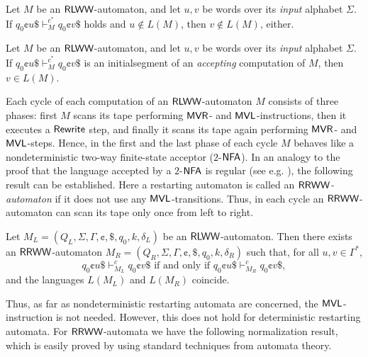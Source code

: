 \begin{proposition}
Let $M$ be an $\mbox{\sf RLWW}$-automaton, and let $u, v$ be words over its \emph{input} alphabet $\Sigma$. If $q_0 \cent u \$ \vdash_M^{c^*} q_0 \cent v \$$ holds and $u \notin L(M)$, then $v \notin L(M)$, either.
\end{proposition}

\begin{proposition}
Let $M$ be an $\mbox{\sf RLWW}$-automaton, and let $u, v$ be words over its \emph{input} alphabet $\Sigma$. If $q_0 \cent u \$ \vdash_M^{c^*} q_0 \cent v \$$ is an initialsegment of an \emph{accepting} computation of $M$, then $v \in L(M)$.
\end{proposition}

Each cycle of each computation of an $\mbox{\sf RLWW}$-automaton $M$ consists of three phases: first $M$ scans its tape performing \index{$\MVR$}$\MVR$- and \index{$\MVL$}$\MVL$-instructions, then it executes a \index{$\Rewrite$}$\Rewrite$ step, and finally it scans its tape again performing \index{$\MVR$}$\MVR$- and \index{$\MVL$}$\MVL$-steps. Hence, in the first and the last phase of each cycle $M$ behaves like a nondeterministic two-way finite-state acceptor ($2$-$\NFA$). In an analogy to the proof that the language accepted by a $2$-$\NFA$ is regular (see e.g. \cite{HopcroftMotwaniUllman07}), the following result can be established. Here a restarting automaton is called an \emph{$\mbox{\sf RRWW}$-automaton} if it does not use any \index{$\MVL$}$\MVL$-transitions. Thus, in each cycle an $\mbox{\sf RRWW}$-automaton can scan its tape only once from left to right.

\begin{theorem}
Let $M_L = (Q_L, \Sigma, \Gamma, \cent, \$, q_0, k, \delta_L)$ be an $\mbox{\sf RLWW}$-automaton. Then there exists an $\mbox{\sf RRWW}$-automaton $M_R = (Q_R, \Sigma, \Gamma, \cent, \$, q_0, k, \delta_R)$ such that, for all $u, v \in \Gamma^*$, $$q_0 \cent u \$ \vdash_{M_L}^c q_0 \cent v \$ \text{ if and only if } q_0 \cent u \$ \vdash_{M_R}^c q_0 \cent v \$,$$ and the languages $L(M_L)$ and $L(M_R)$ coincide.
\end{theorem}

Thus, as far as nondeterministic restarting automata are concerned, the \index{$\MVL$}$\MVL$-instruction is not needed. However, this does not hold for deterministic restarting automata. For $\mbox{\sf RRWW}$-automata we have the following normalization result, which is easily proved by using standard techniques from automata theory.

